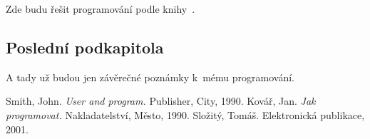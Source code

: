 \documentclass{article}
\begin{document}
\medskip
Zde budu řešit programování podle knihy~\cite{kovar}.


\subsection{Poslední podkapitola}
A tady už budou jen závěrečné poznámky k~mému programování.


\newpage
\begin{thebibliography}{99}

 Smith, John. \emph{User and program.}
                Publisher, City, 1990.
 Kovář, Jan. \emph{Jak programovat.}
                Nakladatelství, Město, 1990.
 Složitý, Tomáš.
                Elektronická publikace, 2001.

\end{thebibliography}
\end{document}
